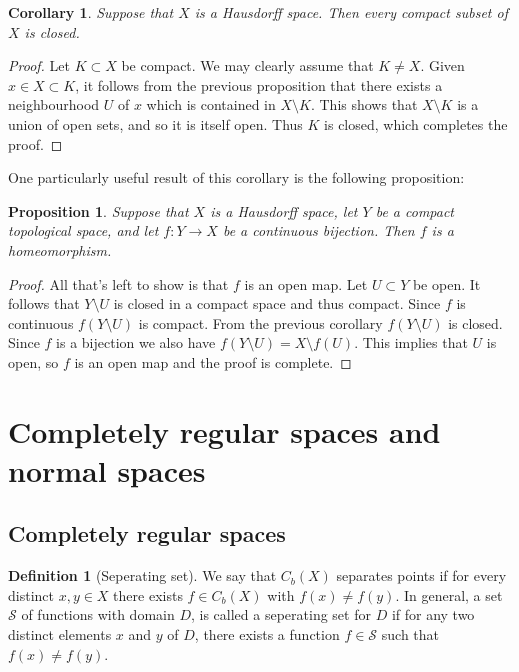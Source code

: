 \documentclass[11pt,a4paper]{article}
\theoremstyle{definition}
\newtheorem{definition}{Definition}[section]
\theoremstyle{plain}
\newtheorem{proposition}[theorem]{Proposition}
\newtheorem{corollary}[theorem]{Corollary}
\begin{document}
  \begin{corollary}
    Suppose that $X$ is a Hausdorff space. Then every compact subset
    of $X$ is closed.
  \end{corollary}
  \begin{proof}
    Let $K \subset X$ be compact. We may clearly assume that 
    $K \neq X$. Given $x \in X \subset K$, it follows from the previous
    proposition that there exists a neighbourhood $U$ of $x$ which is 
    contained in $X \setminus K$. This shows that $X \setminus K$ is a 
    union of open sets, and so it is itself open. Thus $K$ is 
    closed, which completes the proof. 
  \end{proof}
  
  One particularly useful result of this corollary is the following
  proposition:
  \begin{proposition}
    Suppose that $X$ is a Hausdorff space, let $Y$ be a compact 
    topological space, and let $f \colon Y \to X$ be a continuous 
    bijection. Then $f$ is a homeomorphism.
  \end{proposition}
  \begin{proof}
    All that's left to show is that $f$ is an open map. Let $U \subset Y$
    be open. It follows that $Y \setminus U$ is closed in a compact space
    and thus compact. Since $f$ is continuous $f(Y \setminus U)$ is
    compact. From the previous corollary $f(Y \setminus U)$ is closed.
    Since $f$ is a bijection we also have 
    $f(Y \setminus U) = X \setminus f(U)$. This implies that $U$ is open,
    so $f$ is an open map and the proof is complete.
  \end{proof}

  \newpage

  \section{Completely regular spaces and normal spaces}

  \subsection{Completely regular spaces}

  \begin{definition}[Seperating set]
    We say that $C_b(X)$ separates points if for every distinct 
    $x, y \in X$ there exists $f \in C_b(X)$ with $f(x) \neq f(y)$.
    In general, a set $\mathcal S$ of functions with domain $D$,
    is called a seperating set for $D$ if for any two distinct elements
    $x$ and $y$ of $D$, there exists a function $f \in \mathcal S$ such
    that $f(x) \neq f(y)$.
  \end{definition}
  
\end{document}

